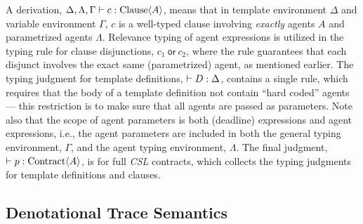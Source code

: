 \documentclass[orivec,final]{llncs-href}
\newcommand{\csl}{\textit{CSL}}
\newcommand{\cor}[2]{#1\ \mathsf{or}\ #2}
\newcommand{\cordefault}{\cor{c_1}{c_2}}
\begin{document}
A derivation, $\Delta,\Lambda,\Gamma \vdash c : \mathrm{Clause} \langle A \rangle$, means that
in template environment $\Delta$ and variable environment $\Gamma$,
$c$ is a well-typed clause involving \emph{exactly} agents
$A$ and parametrized agents $\Lambda$. Relevance typing of agent
expressions is utilized in the typing rule for clause disjunctions,
$\cordefault$, where the rule guarantees that each disjunct involves
the exact same (parametrized) agent, as mentioned earlier. The typing
judgment for template definitions, $\vdash D : \Delta$, contains a
single rule, which requires that the body of a template definition not
contain ``hard coded'' agents --- this restriction is to make sure
that all agents are passed as parameters. Note also that the scope of
agent parameters is both (deadline) expressions and agent expressions,
i.e., the agent parameters are included in both the  general typing
environment, $\Gamma$, and the agent typing environment,
$\Lambda$. The final judgment, $\vdash p : \mathrm{Contract} \langle A \rangle$, is for full \csl{}
contracts, which collects the typing judgments for template
definitions and clauses.

\subsection{Denotational Trace Semantics}\label{sec:denotation}
\newcommand{\cdenexp}[2]{\mathcal{E}\llbracket #1 \rrbracket #2}
\newcommand{\cdenaexp}[2]{\mathcal{E}_a\llbracket #1 \rrbracket #2}
\newcommand{\cdendexp}[3]{\mathcal{E}_d\llbracket #1 \rrbracket #2 #3}
\newcommand{\cdenclause}[6]{\mathcal{C}\!\left\llbracket #1
  \right\rrbracket #2 #3 #4 #5 #6}
\newcommand{\cdencontext}[1]{\mathcal{D}\llbracket #1 \rrbracket}
\newcommand{\cdencontract}[1]{\mathcal{P}\llbracket #1 \rrbracket}
\end{document}
